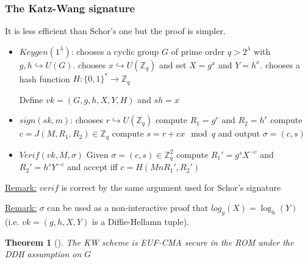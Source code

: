 \documentclass{article}
\newtheorem{thm}{Theorem}[section]
\newcommand{\Thm}[3]{\begin{thm}[#1]\label{#2}#3\end{thm}}
\newcommand{\Rem}{\underline{Remark:} }
\newcommand{\Z}{\mathbb{Z}}
\newcommand{\bit}{\{0,1\}}
\begin{document}
\subsubsection{The Katz-Wang signature}
It is less efficient than Schor's one but the proof is simpler.

\begin{itemize}
\item $Keygen(1^\lambda)$:
\subitem chooses a cyclic group $G$ of prime order $q>2^{\lambda}$ with $g,h\hookrightarrow U(G)$.
\subitem chooses $x\hookrightarrow U(\Z_q)$ and set $X=g^x$ and $Y=h^x$.
\subitem chooses a hash function $H:\bit^*\rightarrow\Z_q$

Define $vk=(G,g,h,X,Y,H)$ and $sh=x$

\item $sign(sk,m)$:
\subitem chooses $r\hookrightarrow U(\Z_q)$
\subitem compute $R_1=g^r$ and $R_2=h^r$
\subitem compute $c=J(M,R_1,R_2)\in\Z_q$
\subitem compute $s=r+cx\mod{q}$ and output $\sigma=(c,s)$

\item $Verif(vk,M,\sigma)$ Given $\sigma=(c,s)\in\Z_q^2$ compute $R_1'=g^sX^{-c}$ and $R_2'=h^sY^{-c}$ and accept iff $c=H(MnR_1',R_2')$
\end{itemize}

\Rem $verif$ is correct by the same argument used for Schor's signature

\Rem $\sigma$ can be used as a non-interactive proof that $log_g(X)=\log_h(Y)$ (i.e. $vk=(g,h,X,Y)$ is a Diffie-Hellamn tuple).

\Thm{}{}{The KW scheme is EUF-CMA secure in the ROM under the DDH assumption on $G$}
\end{document}
